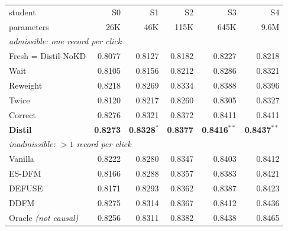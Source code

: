 \begin{tabular}{lrrrrr}
\toprule
student & S0 & S1 & S2 & S3 & S4\\
parameters & 26K & 46K & 115K & 645K & 9.6M\\
\midrule
\multicolumn{6}{l}{\emph{admissible: one record per click}}\\
\quad Fresh = Distil-NoKD & 0.8077 & 0.8127 & 0.8182 & 0.8227 & 0.8218\\
\quad Wait & 0.8105 & 0.8156 & 0.8212 & 0.8286 & 0.8321\\
\quad Reweight & 0.8218 & 0.8269 & 0.8334 & 0.8388 & 0.8396\\
\quad Twice & 0.8120 & 0.8217 & 0.8260 & 0.8305 & 0.8327\\
\quad Correct & 0.8276 & 0.8321 & 0.8372 & 0.8411 & 0.8411\\
\quad \textbf{Distil} & \textbf{0.8273} & \textbf{0.8328}$^{\ast}$ & \textbf{0.8377} & \textbf{0.8416}$^{\ast\ast}$ & \textbf{0.8437}$^{\ast\ast}$\\
\midrule
\multicolumn{6}{l}{\emph{inadmissible: $>1$ record per click}}\\
\quad Vanilla & 0.8222 & 0.8280 & 0.8347 & 0.8403 & 0.8412\\
\quad ES-DFM & 0.8166 & 0.8288 & 0.8357 & 0.8383 & 0.8421\\
\quad DEFUSE & 0.8171 & 0.8293 & 0.8362 & 0.8387 & 0.8423\\
\quad DDFM & 0.8275 & 0.8314 & 0.8367 & 0.8412 & 0.8436\\
\midrule
\quad Oracle \emph{(not causal)} & 0.8256 & 0.8311 & 0.8382 & 0.8438 & 0.8465\\
\bottomrule
\end{tabular}
